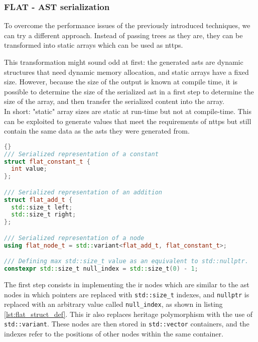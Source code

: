 \documentclass[../main]{subfiles}
\begin{document}
\subsubsection{
  FLAT - AST serialization
}

\label{lbl:flat-technique}

To overcome the performance issues of the previously introduced techniques,
we can try a different approach. Instead of passing trees as they are,
they can be transformed into static arrays which can be used as \glspl{nttp}.

This transformation might sound odd at first: the generated \glspl{ast} are
dynamic structures that need dynamic memory allocation, and static arrays
have a fixed size. However, because the size of the output is known
at compile time, it is possible to determine the size of the serialized
\gls{ast} in a first step to determine the size of the array,
and then transfer the serialized content into the array.
\\

In short: "static" array sizes are static at run-time but not at compile-time.
This can be exploited to generate values that meet the requirements
of \glspl{nttp} but still contain the same data as the \glspl{ast} they were
generated from.

\begin{lstlisting}[language=C++, label=lst:flat_struct_def]{}
/// Serialized representation of a constant
struct flat_constant_t {
  int value;
};

/// Serialized representation of an addition
struct flat_add_t {
  std::size_t left;
  std::size_t right;
};

/// Serialized representation of a node
using flat_node_t = std::variant<flat_add_t, flat_constant_t>;

/// Defining max std::size_t value as an equivalent to std::nullptr.
constexpr std::size_t null_index = std::size_t(0) - 1;
\end{lstlisting}

The first step consists in implementing the \gls{ir} nodes which are similar
to the \gls{ast} nodes in which pointers are replaced with
\lstinline{std::size_t} indexes,
and \lstinline{nullptr} is replaced with an arbitrary value called
\lstinline{null_index}, as shown in listing \ref{lst:flat_struct_def}.
This \gls{ir} also replaces heritage polymorphism with the use of
\lstinline{std::variant}.
These nodes are then stored in \lstinline{std::vector} containers,
and the indexes refer to the positions of other nodes within the same container.
\end{document}
